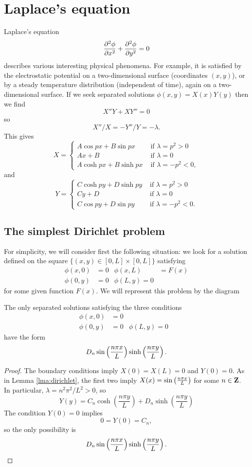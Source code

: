 \section{Laplace's equation}

Laplace's equation
\[\frac{\partial^2 \phi}{\partial x ^2}+\frac{\partial^2 \phi}{\partial y ^2}=0\]
describes various interesting physical phenomena. For example, it is satisfied by the electrostatic potential on a two-dimensional surface (coordinates $(x,y)$), or by a steady temperature distribution (independent of time), again on a two-dimensional surface. If we seek separated solutions $\phi(x,y)=X(x)Y(y)$ then we find
\[X''Y+XY''=0\]
so
\[X''/X=-Y''/Y=-\lambda.\]
This gives
\[
X=\begin{cases}
  A\cos px+B\sin px&\mbox{ if }\lambda=p^2>0\\
  Ax+B&\mbox{ if }\lambda=0\\
  A\cosh px+B\sinh px&\mbox{ if }\lambda=-p^2<0,
\end{cases}
\]
and
\[
Y=\begin{cases}
  C\cosh py+D\sinh py&\mbox{ if }\lambda=p^2>0\\
  Cy+D&\mbox{ if }\lambda=0\\
  C\cos py+D\sin py&\mbox{ if }\lambda=-p^2<0.
\end{cases}
\]

\subsection{The simplest Dirichlet problem}

For simplicity, we will consider first the following situation: we look for a solution defined on the square $\{(x,y)\in [0,L]\times [0,L]\}$ satisfying
\begin{align*}
\phi(x,0)&=0&\phi(x,L)&=F(x)\\
\phi(0,y)&=0&\phi(L,y)=0
\end{align*}
for some given function $F(x)$. We will represent this problem by the diagram


\begin{lma}
The only separated solutions satisfying the three conditions
\begin{align*}
\phi(x,0)&=0&&\\
\phi(0,y)&=0&\phi(L,y)=0
\end{align*}
have the form
\[D_n\sin\left(\frac{n \pi x}{L}\right)\sinh\left(\frac{n\pi y}{L}\right).\]
\end{lma}
\begin{proof}
The boundary conditions imply $X(0)=X(L)=0$ and $Y(0)=0$. As in Lemma \ref{lma:dirichlet}, the first two imply $X(x)=\sin\left(\frac{n \pi x}{L}\right)$ for some $n\in\mathbf{Z}$. In particular, $\lambda=n^2\pi^2/L^2>0$, so
\[Y(y)=C_n\cosh\left(\frac{n\pi y}{L}\right)+D_n\sinh\left(\frac{n\pi y}{L}\right)\]
The condition $Y(0)=0$ implies
\[0=Y(0)=C_n,\]
so the only possibility is 
\[D_n\sin\left(\frac{n \pi x}{L}\right)\sinh\left(\frac{n\pi y}{L}\right).\]
\end{proof}

